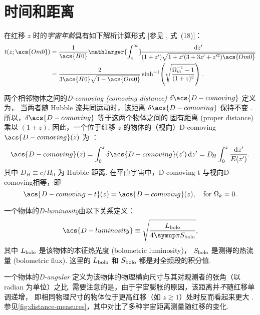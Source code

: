 \section{时间和距离}

在红移 $z$ 时的\emph{宇宙年龄}具有如下解析计算形式
[参见 , 式~(18)]：
\begin{align}
  \label{eq:universe-age}
  t(z; \acs{Om0})
    & = \frac{1}{\acs{H0}} \mathlarger{\int_z^{\infty}}
      \!\frac{\D{z'}}{(1+z')\sqrt{1 + z' (3+3z'+z'^2) \acs{Om0}}}
      \nonumber \\
    & = \frac{2}{3 \acs{H0} \sqrt{1-\acs{Om0}}} \sinh^{-1}
      \!\left( \sqrt{\frac{\Omega_m^{-1} - 1}{(1+z)^3}} \right).
\end{align}

两个相邻物体之间的\emph{\acl{D-comoving} (comoving distance)}
$\delta\acs{D-comoving}$ 定义为，
当两者随 Hubble 流共同运动时，该距离 $\delta\acs{D-comoving}$ 保持不变
\cite{hogg1999}.
所以，$\delta\acs{D-comoving}$ 等于这两个物体之间的
固有距离 (proper distance) 乘以 $(1+z)$.
因此，一个位于红移 $z$ 的物体的（视向）\acl{D-comoving}
$\acs{D-comoving}(z)$ 为 \cite{hogg1999}：
\begin{equation}
  \label{eq:distance-comoving}
  \acs{D-comoving}(z)
    = \int_0^z \delta\acs{D-comoving}(z')\,\D{z'}
    = D_{\!H} \int_0^z \frac{\D{z'}}{E(z')} .
\end{equation}
其中 $D_{\!H} \equiv c / H_0$ 为 Hubble 距离.
在平直宇宙中，\acf{D-comoving-t} 与视向\acl{D-comoving}相等，即
\begin{equation}
  \label{eq:distance-comoving-t}
  \acs{D-comoving-t}(z) = \acs{D-comoving}(z),
    \quad \text{for } \Omega_k = 0 .
\end{equation}

一个物体的\emph{\acf{D-luminosity}}由以下关系定义：
\begin{equation}
  \label{eq:dl-def}
  \acs{D-luminosity} \equiv
    \sqrt{\frac{L_{\R{bolo}}}{4\Cpi S_{\R{bolo}}}} ,
\end{equation}
其中 $L_{\mathrm{bolo}}$ 是该物体的本征热光度 (bolometric luminosity)，
$S_{\mathrm{bolo}}$ 是测得的热流量 (bolometric flux).
这里的 $L_{\mathrm{bolo}}$ 和 $S_{\mathrm{bolo}}$ 都是对全频段的积分值.

一个物体的\emph{\acf{D-angular}}
定义为该物体的物理横向尺寸与其对观测者的张角（以 \si{radian} 为单位）之比.
需要注意的是，由于宇宙膨胀的原因，该距离并\emph{不}随红移单调递增，
即相同物理尺寸的物体位于更高红移（如 $z \gtrsim 1$）处时反而看起来更大 \cite{hogg1999}.
参见\autoref{fig:distance-measures}，其中对比了多种宇宙距离测量随红移的变化.

